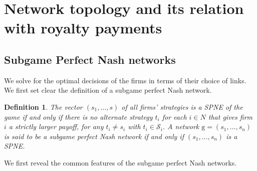 \documentclass{article}
\newtheorem{definition}{Definition}
\begin{document}
\section{Network topology and its relation with royalty payments}
 \subsection{Subgame Perfect Nash networks}
We solve for the optimal decisions of the firms in terms of their choice of links. We first set clear the definition of a subgame perfect Nash network. \\

\begin{definition}
The vector $(s_1,\ldots,s)$ of all firms' strategies is a SPNE of the game if and only if there is no alternate strategy $t_i$ for each $i\in N$ that gives firm $i$ a strictly larger payoff, for any $t_i\neq s_i$ with $t_i\in \mathcal{S}_i$. A network $\text{g}=(s_1,\ldots, s_n)$ is said to be a subgame perfect Nash network if and only if $(s_1,\ldots, s_n)$ is a SPNE. 
\end{definition}

We first reveal the common features of the subgame perfect Nash networks.\\
\end{document}

